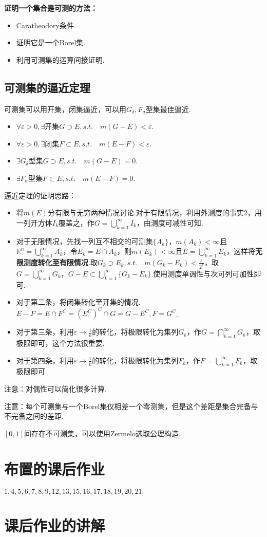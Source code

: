 \documentclass[bwprint, withoutpreface]{cumcmthesis}
\begin{document}
\textbf{证明一个集合是可测的方法：}
\begin{itemize}[itemindent=2em]
	\item Caratheodory条件.
	\item 证明它是一个Borel集.
	\item 利用可测集的运算间接证明.
\end{itemize}

\subsection{可测集的逼近定理}
\indent 可测集可以用开集，闭集逼近，可以用$G_{\delta},F_{\sigma}$型集最佳逼近.

\begin{itemize}[itemindent=2em]
	\item $\forall \varepsilon > 0, \exists \mbox{开集}G \supset E, s.t. \quad m(G - E) < \varepsilon$.
	\item $\forall \varepsilon > 0, \exists \mbox{闭集}F \subset E, s.t. \quad m(E - F) < \varepsilon$.
	\item $\exists G_{\delta} \mbox{型集} G \supset E, s.t. \quad m(G - E) = 0$.
	\item $\exists F_{\sigma} \mbox{型集} F \subset E, s.t. \quad m(E - F) = 0$.
\end{itemize}

逼近定理的证明思路：
\begin{itemize}[itemindent=2em]
	\item 将$m(E)$分有限与无穷两种情况讨论.对于有限情况，利用外测度的事实2，用一列开方体${I_k}$覆盖之，作$G = \bigcup_{k = 1}^{\infty}{I_k}$，由测度可减性可知.
	\item 对于无限情况，先找一列互不相交的可测集$\{A_k\}$，$m(A_k) < \infty$且$\mathbb{R}^n = \bigcup_{k = 1}^{\infty}{A_k}$，令$E_k = E \cap A_k$，则$m(E_k) < \infty$且$E = \bigcup_{k = 1}^{\infty}{E_k}$，这样将\textbf{无限测度转化至有限情况}.取$G_k \supset E_k, s.t.\quad m(G_k - E_k) < \frac{\varepsilon}{2^k}$，取$G = \bigcup_{k = 1}^{\infty}{G_k}$，$G - E \subset \bigcup_{k = 1}^{\infty}\{G_k - E_k\}$.使用测度单调性与次可列可加性即可.
	\item 对于第二条，将闭集转化至开集的情况.$E - F = E \cap F^C = {(E^C)}^C \cap G = G - E^C, F = G^C$.
	\item 对于第三条，利用$\varepsilon \to \frac{1}{k}$的转化，将极限转化为集列${G_k}$，作$G = \bigcap_{k = 1}^{\infty}{G_k}$，取极限即可，这个方法很重要.
	\item 对于第四条，利用$\varepsilon \to \frac{1}{k}$的转化，将极限转化为集列${F_k}$，作$F = \bigcup_{k = 1}^{\infty}{F_k}$，取极限即可.
\end{itemize}

注意：对偶性可以简化很多计算.

注意：每个可测集与一个Borel集仅相差一个零测集，但是这个差距是集合完备与不完备之间的差距.

$[0, 1]$间存在不可测集，可以使用Zermelo选取公理构造.

\appendix
\section{布置的课后作业}
\indent $1,4,5,6,7,8,9,12,13,15,16,17,18,19,20,21.$

\section{课后作业的讲解}
\end{document}
